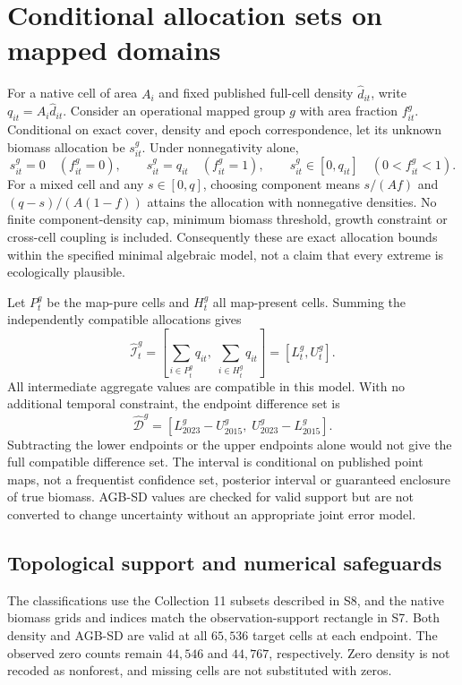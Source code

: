 \documentclass[11pt,a4paper]{article}
\begin{document}
\section{Conditional allocation sets on mapped domains}

For a native cell of area $A_i$ and fixed published full-cell density $\widehat d_{it}$, write $q_{it}=A_i\widehat d_{it}$. Consider an operational mapped group $g$ with area fraction $f_{it}^g$. Conditional on exact cover, density and epoch correspondence, let its unknown biomass allocation be $s_{it}^g$. Under nonnegativity alone,
\begin{equation}
s_{it}^g=0\quad(f_{it}^g=0),\qquad
s_{it}^g=q_{it}\quad(f_{it}^g=1),\qquad
s_{it}^g\in[0,q_{it}]\quad(0<f_{it}^g<1).
\end{equation}
For a mixed cell and any $s\in[0,q]$, choosing component means $s/(Af)$ and $(q-s)/(A(1-f))$ attains the allocation with nonnegative densities. No finite component-density cap, minimum biomass threshold, growth constraint or cross-cell coupling is included. Consequently these are exact allocation bounds within the specified minimal algebraic model, not a claim that every extreme is ecologically plausible.

Let $P_t^g$ be the map-pure cells and $H_t^g$ all map-present cells. Summing the independently compatible allocations gives
\begin{equation}
\widehat{\mathcal I}_t^g=\left[\sum_{i\in P_t^g}q_{it},\;\sum_{i\in H_t^g}q_{it}\right]=[L_t^g,U_t^g].
\end{equation}
All intermediate aggregate values are compatible in this model. With no additional temporal constraint, the endpoint difference set is
\begin{equation}
\widehat{\mathcal D}^g=[L_{2023}^g-U_{2015}^g,\;U_{2023}^g-L_{2015}^g].
\end{equation}
Subtracting the lower endpoints or the upper endpoints alone would not give the full compatible difference set. The interval is conditional on published point maps, not a frequentist confidence set, posterior interval or guaranteed enclosure of true biomass. AGB-SD values are checked for valid support but are not converted to change uncertainty without an appropriate joint error model.

\subsection{Topological support and numerical safeguards}
The classifications use the Collection 11 subsets described in S8, and the native biomass grids and indices match the observation-support rectangle in S7. Both density and AGB-SD are valid at all $65{,}536$ target cells at each endpoint. The observed zero counts remain $44{,}546$ and $44{,}767$, respectively. Zero density is not recoded as nonforest, and missing cells are not substituted with zeros.
\end{document}
